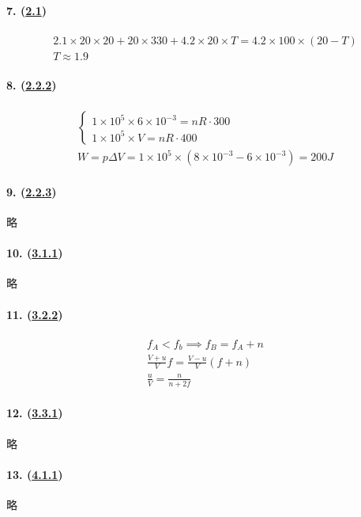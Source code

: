 \paragraph{7. (\hyperref[sec:2.1]{2.1})}

\begin{gather*}
    2.1\times20\times20+20\times330+4.2\times20\times T=4.2\times100\times(20-T)\\
    T\approx 1.9
\end{gather*}

\paragraph{8. (\hyperref[subsec:2.2.2]{2.2.2})}

\begin{gather*}
    \begin{cases}
        1\times10^5\times6\times10^{-3}=nR\cdot300\\
        1\times10^5\times V=nR\cdot 400
    \end{cases}\\
    W=p\Delta V=1\times10^5\times(8\times10^{-3}-6\times10^{-3})=200J
\end{gather*}

\paragraph{9. (\hyperref[subsec:2.2.3]{2.2.3})} 略
\paragraph{10. (\hyperref[subsec:3.1.1]{3.1.1})} 略
\paragraph{11. (\hyperref[subsec:3.2.2]{3.2.2})}

\begin{gather*}
    f_A<f_b\implies f_B=f_A+n\\
    \frac{V+u}{V}f=\frac{V-u}{V}(f+n)\\
    \frac{u}{V}=\frac{n}{n+2f}
\end{gather*}

\paragraph{12. (\hyperref[subsec:3.3.1]{3.3.1})} 略
\paragraph{13. (\hyperref[subsec:4.1.1]{4.1.1})} 略
